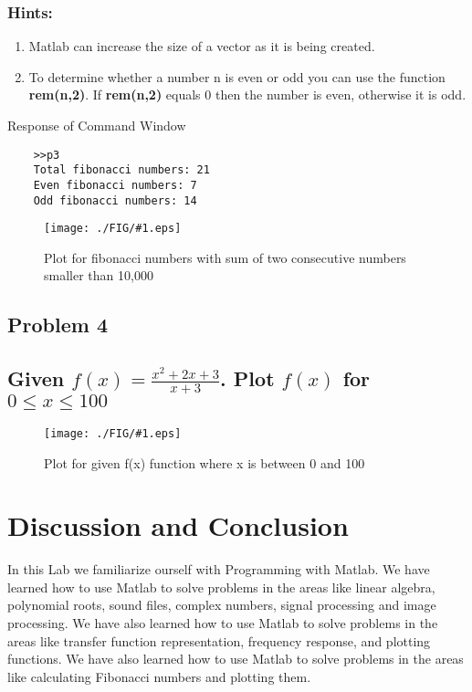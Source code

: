 \documentclass[a4paper,11pt]{article}
\newcommand\ddfrac[2]{\frac{\displaystyle #1}{\displaystyle #2}}
\newcommand{\mobs}[2]{
    \begin{figure}[H]
        \centering
        \texttt{[image: ./FIG/\#1.eps]}
        \caption{#2}
    \end{figure}
   
}
\begin{document}
\subsubsection*{Hints:}
\begin{enumerate}
    \item Matlab can increase the size of a vector as it is being created.
    \item To determine whether a number n is even or odd you can use the function \textbf{rem(n,2)}. If
          \textbf{rem(n,2)} equals 0 then the number is even, otherwise it is odd.
\end{enumerate}


Response of Command Window
\begin{verbatim}
    >>p3
    Total fibonacci numbers: 21 
    Even fibonacci numbers: 7 
    Odd fibonacci numbers: 14 
\end{verbatim}

\mobs{fibo}{Plot for fibonacci numbers with sum of two consecutive numbers smaller than 10,000}



\subsection{Problem 4}
\subsection*{Given $f(x)= \ddfrac{x^2+2x+3}{x+3}$. Plot $f(x)$ for $0 \leq x \leq 100$}
\mobs{fx}{Plot for given f(x) function where x is between 0 and 100}






\section{Discussion and Conclusion}
In this Lab we familiarize ourself with Programming with Matlab. We have learned how to use Matlab to solve problems in the areas like linear algebra, polynomial roots, sound files, complex numbers, signal processing and image processing. We have also learned how to use Matlab to solve problems in the areas like transfer function representation, frequency response, and plotting functions. We have also learned how to use Matlab to solve problems in the areas like calculating Fibonacci numbers and plotting them.
\end{document}

